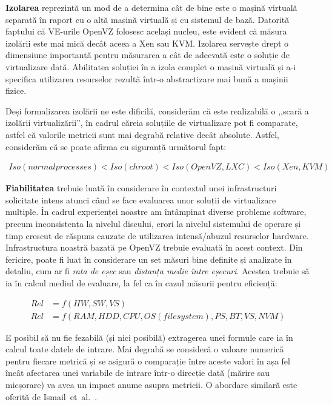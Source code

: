 \textbf{Izolarea} reprezintă un mod de a determina cât de bine este o
mașină virtuală separată în raport cu o altă mașină virtuală și cu sistemul
de bază. Datorită faptului că VE-urile OpenVZ folosesc același nucleu,
este evident că măsura izolării este mai mică decât aceea a Xen sau KVM.
Izolarea servește drept o dimensiune importantă pentru măsurarea a cât
de adecvată este o soluție de virtualizare dată. Abilitatea soluției
în a izola complet o mașină virtuală și a-i specifica utilizarea
resurselor rezultă într-o abstractizare mai bună a mașinii fizice.

Deși formalizarea izolării ne este dificilă, considerăm că este realizabilă
o ,,scară a izolării virtualizării'', în cadrul căreia soluțiile de
virtualizare pot fi comparate, astfel că valorile metricii sunt mai degrabă
relative decât absolute. Astfel, considerăm că se poate afirma cu 
siguranță următorul fapt:

\begin{align}
Iso(normal processes) < Iso(chroot) < Iso(OpenVZ, LXC) < Iso(Xen,KVM)
\end{align}

\textbf{Fiabilitatea} trebuie luată în considerare în contextul unei
infrastructuri solicitate intens atunci când se face evaluarea unor soluții
de virtualizare multiple. În cadrul experienței noastre am întâmpinat
diverse probleme software, precum inconsistența la nivelul discului, erori
la nivelul sistemului de operare și timp crescut de răspuns cauzate de
utilizarea intensă/abuzul resurselor hardware. Infrastructura noastră
bazată pe OpenVZ trebuie evaluată în acest context. Din fericire, poate fi
luat în considerare un set măsuri bine definite și analizate în detaliu,
cum ar fi \textit{rata de eșec} sau \textit{distanța medie între eșecuri}.
Acestea trebuie să ia în calcul mediul de evaluare, la fel ca în cazul
măsurii pentru eficiență:

\begin{align}
Rel & = f(HW, SW, VS)\\
Rel & = f(RAM, HDD, CPU, OS (filesystem), PS, BT, VS, NVM)
\end{align}

E posibil să nu fie fezabilă (și nici posibilă) extragerea unei
formule care ia în calcul toate datele de intrare. Mai degrabă se consideră
o valoare numerică pentru fiecare metrică și se asigură o comparație între
aceste valori în așa fel încât afectarea unei variabile de intrare într-o
direcție dată (mărire sau micșorare) va avea un impact anume asupra
metricii. O abordare similară este oferită de
Ismail~et~al.~\cite{virt-metrics}.

